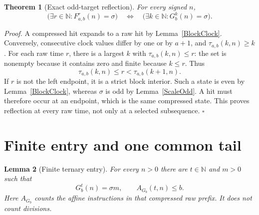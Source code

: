 \documentclass[11pt,letterpaper]{article}
\newcommand{\N}{\mathbb{N}}
\newtheorem{theorem}{Theorem}
\newtheorem{lemma}[theorem]{Lemma}
\newenvironment{proof}{\noindent\textit{Proof.}}{\hfill\(\square\)}
\begin{document}
\begin{theorem}[Exact odd-target reflection]\label{TargetReflection}
For every signed \(n\),
\[
\bigl(\exists r\in\N:F_{a,b}^r(n)=\sigma\bigr)
\quad\Longleftrightarrow\quad
\bigl(\exists k\in\N:G_b^k(n)=\sigma\bigr).
\]
\end{theorem}

\begin{proof}
A compressed hit expands to a raw hit by Lemma~\ref{BlockClock}.
Conversely, consecutive clock values differ by one or by \(a+1\),
and \(\tau_{a,b}(k,n)\ge k\). For each raw time \(r\), there is a largest
\(k\) with \(\tau_{a,b}(k,n)\le r\): the set is nonempty because it contains
zero and finite because \(k\le r\). Thus
\[
\tau_{a,b}(k,n)\le r<\tau_{a,b}(k+1,n).
\]
If \(r\) is not the left endpoint, it is a strict block interior.
Such a state is even by Lemma~\ref{BlockClock}, whereas \(\sigma\) is odd
by Lemma~\ref{ScaleOdd}. A hit must therefore occur at an endpoint, which
is the same compressed state. This proves reflection at every raw time,
not only at a selected subsequence.
\end{proof}

\section{Finite entry and one common tail}

\begin{lemma}[Finite ternary entry]\label{FiniteEntry}
For every \(n>0\) there are \(t\in\N\) and \(m>0\) such that
\[
G_b^t(n)=\sigma m,
\qquad
A_{G_b}(t,n)\le b.
\]
Here \(A_{G_b}\) counts the affine instructions in that compressed raw
prefix. It does not count divisions.
\end{lemma}
\end{document}
